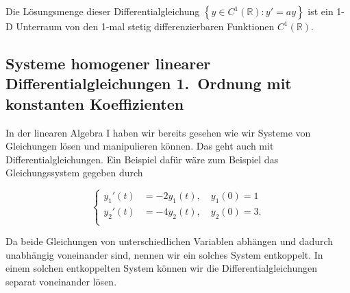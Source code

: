 Die Lösungsmenge dieser Differentialgleichung \( \left\{ y \in C^1(\mathbb{R}): y' = ay \right\} \) ist ein 1-D Unterraum von den 1-mal stetig differenzierbaren Funktionen \( C^1(\mathbb{R}) \).

\subsection{Systeme homogener linearer Differentialgleichungen 1.\ Ordnung mit konstanten Koeffizienten}

In der linearen Algebra I haben wir bereits gesehen wie wir Systeme von Gleichungen lösen und manipulieren können. Das geht auch mit Differentialgleichungen. Ein Beispiel dafür wäre zum Beispiel das Gleichungssystem gegeben durch

\vspace{1\baselineskip}

\begin{equation*}
    \left\{ 
        \begin{aligned}
            y_1'(t) &= -2 y_1(t), \quad y_1(0) = 1 \\
            y_2'(t) &= -4 y_2(t), \quad y_2(0) = 3. \\
        \end{aligned}
    \right.
\end{equation*}

\vspace{0.5\baselineskip}

Da beide Gleichungen von unterschiedlichen Variablen abhängen und dadurch unabhängig voneinander sind, nennen wir ein solches System entkoppelt. In einem solchen entkoppelten System können wir die Differentialgleichungen separat voneinander lösen. 

\newpage

